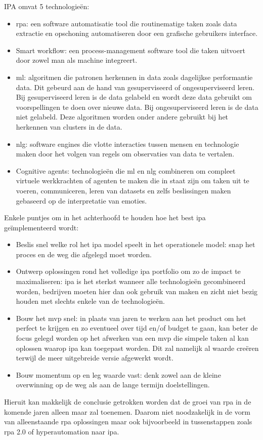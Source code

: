 IPA omvat 5 technologieën:
\begin{itemize}
	\item \acrshort{rpa}: een software automatisatie tool die routinematige taken zoals data extractie en opschoning automatiseren door een grafische gebruikers interface.
	\item Smart \gls{workflow}: een process-management software tool die taken uitvoert door zowel man als machine integreert.
	\item  \acrshort{ml}: algoritmen die patronen herkennen in data zoals dagelijkse performantie data. Dit gebeurd aan de hand van gesuperviseerd of ongesuperviseerd leren. Bij gesuperviseerd leren is de data gelabeld en wordt deze data gebruikt om voorspellingen te doen over nieuwe data. Bij ongesuperviseerd leren is de data niet gelabeld. Deze algoritmen worden onder andere gebruikt bij het herkennen van clusters in de data.
	\item  \acrshort{nlg}: software engines die vlotte interacties tussen mensen en technologie maken door het volgen van regels om observaties van data te vertalen.
	\item Cognitive agents: technologieën die  \acrshort{ml} en  \acrshort{nlg} combineren om compleet virtuele werkkrachten of agenten te maken die in staat zijn om taken uit te voeren, communiceren, leren van datasets en zelfs beslissingen maken gebaseerd op de interpretatie van emoties.
\end{itemize}

Enkele puntjes om in het achterhoofd te houden hoe het best  \acrshort{ipa} geïmplementeerd wordt:
\begin{itemize}
	\item Beslis snel welke rol het \acrshort{ipa} model speelt in het operationele model: snap het proces en de weg die afgelegd moet worden.
	\item Ontwerp oplossingen rond het volledige \acrshort{ipa} portfolio om zo de impact te maximaliseren: \acrshort{ipa} is het sterkst wanneer alle technologieën gecombineerd worden, bedrijven moeten hier dan ook gebruik van maken en zicht niet bezig houden met slechts enkele van de technologieën.
	\item Bouw het \acrfull{mvp} snel: in plaats van jaren te werken aan het product om het perfect te krijgen en zo eventueel over tijd en/of budget te gaan, kan beter de focus gelegd worden op het afwerken van een \acrshort{mvp} die simpele taken al kan oplossen waarop \acrshort{ipa} kan toegepast worden. Dit zal namelijk al waarde creëren terwijl de meer uitgebreide versie afgewerkt wordt.
	\item Bouw momentum op en leg waarde vast: denk zowel aan de kleine overwinning op de weg als aan de  lange termijn doelstellingen.
\end{itemize} \autocite{everythingIPA}

Hieruit kan makkelijk de conclusie getrokken worden dat de groei van \acrshort{rpa} in de komende jaren alleen maar zal toenemen. Daarom niet noodzakelijk in de vorm van alleenstaande \acrshort{rpa} oplossingen maar ook bijvoorbeeld in tussenstappen zoals \acrshort{rpa} 2.0 of hyperautomation naar \acrshort{ipa}.